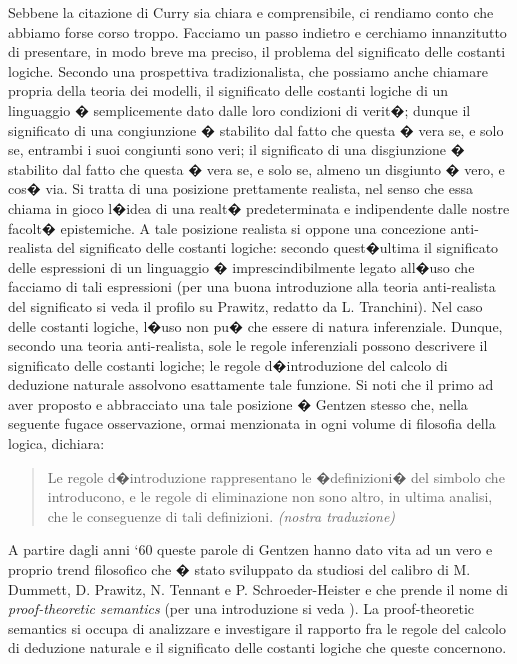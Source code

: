 \documentclass[a4paper,12pt]{aphex}
\begin{document}
Sebbene la citazione di Curry sia chiara e comprensibile, ci rendiamo conto che abbiamo forse corso troppo. Facciamo un passo indietro e cerchiamo innanzitutto di presentare, in modo breve ma preciso, il problema del significato delle costanti logiche. Secondo una prospettiva tradizionalista, che possiamo anche chiamare propria della teoria dei modelli, il significato delle costanti logiche di un linguaggio � semplicemente dato dalle loro condizioni di verit�; dunque il significato di una congiunzione � stabilito dal fatto che questa � vera se, e solo se, entrambi i suoi congiunti sono veri; il significato di una disgiunzione � stabilito dal fatto che questa �  vera se, e solo se, almeno un disgiunto � vero, e cos� via.  Si tratta di una posizione prettamente realista, nel senso che essa chiama in gioco l�idea di una realt� predeterminata e indipendente dalle nostre facolt� epistemiche. 
A tale posizione realista si oppone una concezione anti-realista del significato delle costanti logiche: secondo quest�ultima il significato delle espressioni di un linguaggio � imprescindibilmente legato all�uso che facciamo di tali espressioni (per una buona introduzione alla teoria anti-realista del significato si veda il profilo su Prawitz, redatto da L. Tranchini). Nel caso delle costanti logiche, l�uso non pu� che essere di natura inferenziale. Dunque, secondo una teoria anti-realista, sole le regole inferenziali possono descrivere il significato delle costanti logiche;  le regole d�introduzione del calcolo di deduzione naturale assolvono esattamente tale funzione. Si noti che il primo ad aver proposto e abbracciato una tale posizione � Gentzen stesso che, nella seguente fugace osservazione, ormai menzionata in ogni volume di filosofia della logica, dichiara:

\begin{quotation}
Le regole d�introduzione rappresentano le �definizioni� del simbolo che introducono, e le regole di eliminazione non sono altro, in ultima analisi, che le conseguenze di tali definizioni. \cite[p. 80]{gentzen}  \emph{(nostra traduzione)}
\end{quotation}


A partire dagli anni `60 queste parole di Gentzen hanno dato vita ad un vero e proprio trend filosofico che � stato sviluppato da studiosi del calibro di M. Dummett, D. Prawitz, N. Tennant e P. Schroeder-Heister e che prende il nome di \emph{proof-theoretic semantics} (per una introduzione si veda \cite{SchroederHeister}).  La proof-theoretic semantics si occupa di analizzare e investigare il rapporto fra le regole del calcolo di deduzione naturale e il significato delle costanti logiche che queste concernono.
\end{document}
